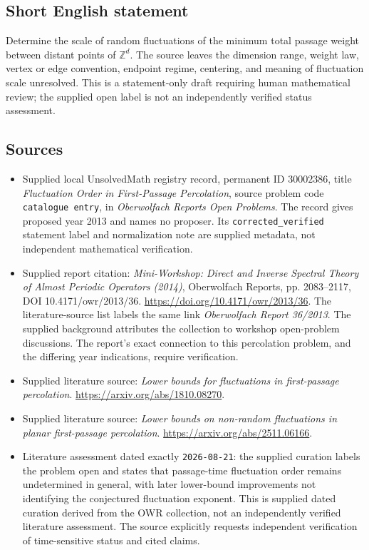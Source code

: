 \documentclass[11pt]{article}
\newcommand{\Z}{\mathbb{Z}}
\begin{document}
\subsection{Short English statement}
Determine the scale of random fluctuations of the minimum total passage weight between distant points of \(\Z^d\). The source leaves the dimension range, weight law, vertex or edge convention, endpoint regime, centering, and meaning of fluctuation scale unresolved. This is a statement-only draft requiring human mathematical review; the supplied open label is not an independently verified status assessment.
\subsection{Sources}
\begin{itemize}
\item Supplied local UnsolvedMath registry record, permanent ID \(30002386\), title \emph{Fluctuation Order in First-Passage Percolation}, source problem code \texttt{catalogue entry}, in \emph{Oberwolfach Reports Open Problems}. The record gives proposed year 2013 and names no proposer. Its \texttt{corrected\_verified} statement label and normalization note are supplied metadata, not independent mathematical verification.
\item Supplied report citation: \emph{Mini-Workshop: Direct and Inverse Spectral Theory of Almost Periodic Operators (2014)}, Oberwolfach Reports, pp. 2083--2117, DOI 10.4171/owr/2013/36. \url{https://doi.org/10.4171/owr/2013/36}. The literature-source list labels the same link \emph{Oberwolfach Report 36/2013}. The supplied background attributes the collection to workshop open-problem discussions. The report's exact connection to this percolation problem, and the differing year indications, require verification.
\item Supplied literature source: \emph{Lower bounds for fluctuations in first-passage percolation}. \url{https://arxiv.org/abs/1810.08270}.
\item Supplied literature source: \emph{Lower bounds on non-random fluctuations in planar first-passage percolation}. \url{https://arxiv.org/abs/2511.06166}.
\item Literature assessment dated exactly \texttt{2026-08-21}: the supplied curation labels the problem open and states that passage-time fluctuation order remains undetermined in general, with later lower-bound improvements not identifying the conjectured fluctuation exponent. This is supplied dated curation derived from the OWR collection, not an independently verified literature assessment. The source explicitly requests independent verification of time-sensitive status and cited claims.
\end{itemize}
\end{document}
